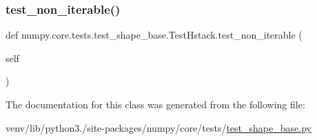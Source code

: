 \subsubsection{\texorpdfstring{test\+\_\+non\+\_\+iterable()}{test\_non\_iterable()}}
{\footnotesize\ttfamily def numpy.\+core.\+tests.\+test\+\_\+shape\+\_\+base.\+Test\+Hstack.\+test\+\_\+non\+\_\+iterable (\begin{DoxyParamCaption}\item[{}]{self }\end{DoxyParamCaption})}



The documentation for this class was generated from the following file\+:\begin{DoxyCompactItemize}
\item 
venv/lib/python3./site-\/packages/numpy/core/tests/\hyperlink{core_2tests_2test__shape__base_8py}{test\+\_\+shape\+\_\+base.\+py}\end{DoxyCompactItemize}
